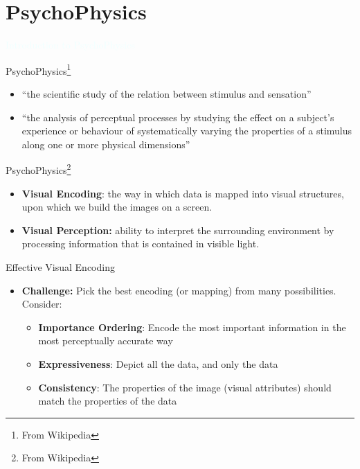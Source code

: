 \documentclass{beamer}
\newcommand{\thblue}[1]{{\Huge {\textcolor{azure}{#1}}}}
\begin{document}
\section{PsychoPhysics}
\begin{frame}{} 
    \begin{center}
        \thblue{Introduction to PsychoPhysics}
    \end{center}
\end{frame}

\begin{frame}{PsychoPhysics\footnote{From Wikipedia}}
    \begin{itemize}
        \item ``the scientific study of the relation between stimulus and sensation''
        \item ``the analysis of perceptual processes by studying the effect on a subject's experience or behaviour of systematically varying the properties of a stimulus along one or more physical dimensions''
    \end{itemize}
\end{frame}

\begin{frame}{PsychoPhysics\footnote{From Wikipedia}} 
    \begin{itemize}
        \item {\bf Visual Encoding}: the way in which data is mapped into visual structures, upon which we build the images on a screen.
        \item {\bf Visual Perception:} ability to interpret the surrounding environment by processing information that is contained in visible light.
    \end{itemize}
\end{frame}  


\begin{frame}{Effective Visual Encoding} 
    \begin{itemize}
        \item {\bf Challenge:} Pick the best encoding (or mapping) from many possibilities. Consider:
        \begin{itemize}
            \item {\bf Importance Ordering}: Encode the most important information in the most perceptually accurate way
            \item {\bf Expressiveness}: Depict all the data, and only the data
            \item {\bf Consistency}: The properties of the image (visual attributes) should match the properties of the data
        \end{itemize}
    \end{itemize}
\end{frame}  
\end{document}
